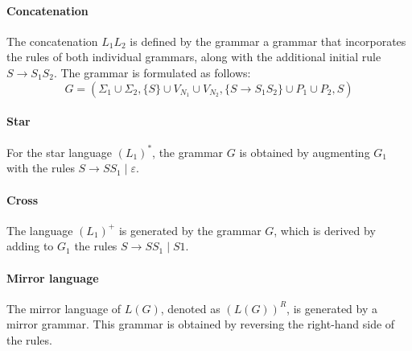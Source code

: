 \paragraph*{Concatenation}
The concatenation $L_1L_2$ is defined by the grammar a grammar that incorporates the rules of both individual grammars, along with the additional initial rule $S\rightarrow S_1S_2$.
The grammar is formulated as follows:
\[G=\left(\Sigma_1 \cup \Sigma_2,\{S\} \cup V_{N_1} \cup V_{N_2},\{S\rightarrow S_1S_2\} \cup P_1 \cup P_2,S\right)\] 

\paragraph*{Star}
For the star language $(L_1)^{\ast}$, the grammar $G$ is obtained by augmenting $G_1$ with the rules $S \rightarrow SS_1\mid\varepsilon$.

\paragraph*{Cross}
The language $(L_1)^{+}$ is generated by the grammar $G$, which is derived by adding to $G_1$ the rules $S \rightarrow SS_1\mid S1$.

\paragraph*{Mirror language}
The mirror language of $L(G)$, denoted as $(L(G))^R$, is generated by a mirror grammar. This grammar is obtained by reversing the right-hand side of the rules.